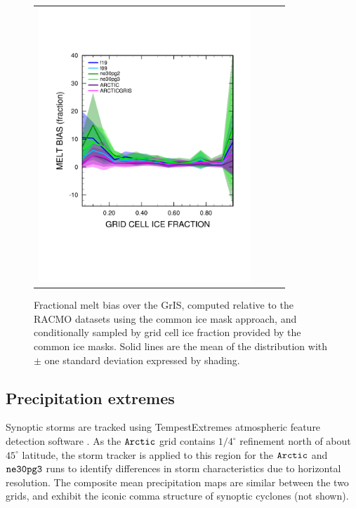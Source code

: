 \documentclass[draft]{agujournal2019}
\begin{document}
\begin{figure}[t]
\begin{center}
\begin{tabular}{cccc}
         \includegraphics[width=80mm]{figs/temp_xy_diffRACMO_melt.pdf}
\end{tabular}
\end{center}
\caption{Fractional melt bias over the GrIS, computed relative to the RACMO datasets using the common ice mask approach, and conditionally sampled by grid cell ice fraction provided by the common ice masks. Solid lines are the mean of the distribution with $\pm$ one standard deviation expressed by shading.}
\label{fig:bias}
\end{figure}

\subsection{Precipitation extremes}

Synoptic storms are tracked using TempestExtremes atmospheric feature detection software \cite{UETAL2021}. As the $\tt Arctic$ grid contains $1/4^{\circ}$ refinement north of about $45^{\circ}$ latitude, the storm tracker is applied to this region for the $\tt Arctic$ and $\tt ne30pg3$ runs to identify differences in storm characteristics due to horizontal resolution. The composite mean precipitation maps are similar between the two grids, and exhibit the iconic comma structure of synoptic cyclones (not shown).
\end{document}
